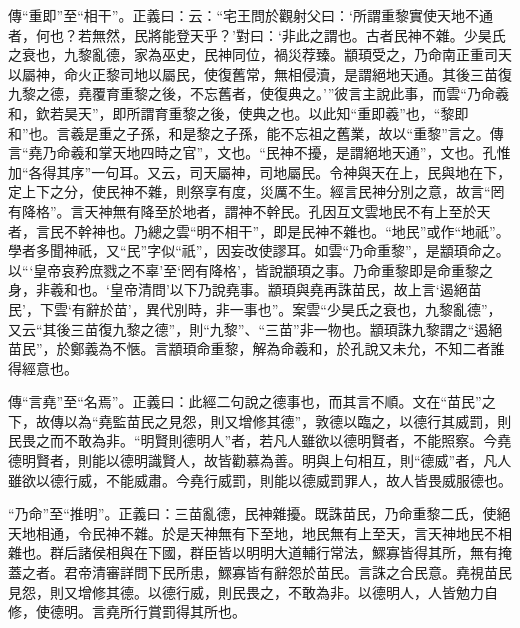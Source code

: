 {\noindent\zhuan{}\fzbyks 傳“重即”至“相干”。正義曰：云：“宅王問於觀射父曰：‘所謂重黎實使天地不通者，何也？若無然，民將能登天乎？’對曰：‘非此之謂也。古者民神不雜。少昊氏之衰也，九黎亂德，家為巫史，民神同位，禍災荐臻。顓頊受之，乃命南正重司天以屬神，命火正黎司地以屬民，使復舊常，無相侵瀆，是謂絕地天通。其後三苗復九黎之德，堯覆育重黎之後，不忘舊者，使復典之。’”彼言主說此事，而雲“乃命羲和，欽若昊天”，即所謂育重黎之後，使典之也。以此知“重即羲”也，“黎即和”也。言羲是重之子孫，和是黎之子孫，能不忘祖之舊業，故以“重黎”言之。傳言“堯乃命羲和掌天地四時之官”，文也。“民神不擾，是謂絕地天通”，文也。孔惟加“各得其序”一句耳。又云，司天屬神，司地屬民。令神與天在上，民與地在下，定上下之分，使民神不雜，則祭享有度，災厲不生。經言民神分別之意，故言“罔有降格”。言天神無有降至於地者，謂神不幹民。孔因互文雲地民不有上至於天者，言民不幹神也。乃總之雲“明不相干”，即是民神不雜也。“地民”或作“地祇”。學者多聞神祇，又“民”字似“祇”，因妄改使謬耳。如雲“乃命重黎”，是顓頊命之。以“‘皇帝哀矜庶戮之不辜’至‘罔有降格’，皆說顓頊之事。乃命重黎即是命重黎之身，非羲和也。‘皇帝清問’以下乃說堯事。顓頊與堯再誅苗民，故上言‘遏絕苗民’，下雲‘有辭於苗’，異代別時，非一事也”。案雲“少昊氏之衰也，九黎亂德”，又云“其後三苗復九黎之德”，則“九黎”、“三苗”非一物也。顓頊誅九黎謂之“遏絕苗民”，於鄭義為不愜。言顓頊命重黎，解為命羲和，於孔說又未允，不知二者誰得經意也。 \par}

{\noindent\zhuan{}\fzbyks 傳“言堯”至“名焉”。正義曰：此經二句說之德事也，而其言不順。文在“苗民”之下，故傳以為“堯監苗民之見怨，則又增修其德”，敦德以臨之，以德行其威罰，則民畏之而不敢為非。“明賢則德明人”者，若凡人雖欲以德明賢者，不能照察。今堯德明賢者，則能以德明識賢人，故皆勸慕為善。明與上句相互，則“德威”者，凡人雖欲以德行威，不能威肅。今堯行威罰，則能以德威罰罪人，故人皆畏威服德也。 \par}

{\noindent\shu{}\fzkt “乃命”至“推明”。正義曰：三苗亂德，民神雜擾。既誅苗民，乃命重黎二氏，使絕天地相通，令民神不雜。於是天神無有下至地，地民無有上至天，言天神地民不相雜也。群后諸侯相與在下國，群臣皆以明明大道輔行常法，鰥寡皆得其所，無有掩蓋之者。君帝清審詳問下民所患，鰥寡皆有辭怨於苗民。言誅之合民意。堯視苗民見怨，則又增修其德。以德行威，則民畏之，不敢為非。以德明人，人皆勉力自修，使德明。言堯所行賞罰得其所也。 \par}

